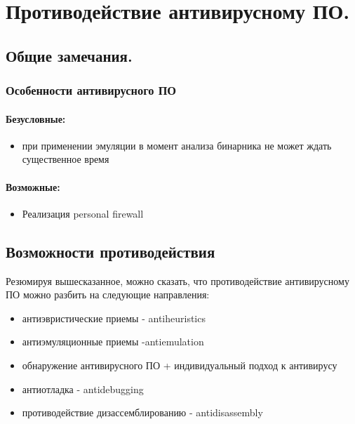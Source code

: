\section{Противодействие антивирусному ПО.}
\label{honeypot_section}
\label{honeypot_section_page}

\subsection{Общие замечания.}

\subsubsection{Особенности антивирусного ПО}

\paragraph{Безусловные:\\}

\begin{itemize}
\item{при применении эмуляции в момент анализа бинарника не может ждать существенное время}
\end{itemize}

\paragraph{Возможные:\\}

\begin{itemize}
\item{Реализация personal firewall}
\end{itemize}


\subsection{Возможности противодействия}

Резюмируя вышесказанное,  можно сказать, что противодействие антивирусному ПО
 можно разбить на следующие направления:

\begin{itemize}
\item{антиэвристические приемы - antiheuristics}
\item{антиэмуляционные приемы -antiemulation}
\item{обнаружение антивирусного ПО + индивидуальный подход к антивирусу}
\item{антиотладка - antidebugging}
\item{противодействие дизассемблированию - antidisassembly}
\end{itemize}

